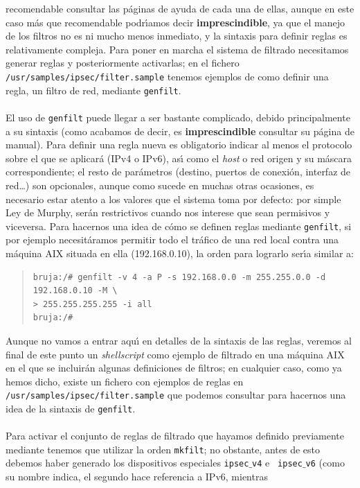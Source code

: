recomendable consultar las p\'aginas de ayuda de cada una de ellas, aunque en
este caso m\'as que recomendable podr\'{\i}amos decir {\bf imprescindible}, ya 
que el manejo de los filtros no es ni mucho menos inmediato, y la sintaxis para 
definir reglas es relativamente compleja. Para poner en marcha el sistema de 
filtrado necesitamos generar reglas y posteriormente activarlas; en el fichero 
{\tt /usr/samples/ipsec/filter.sample} tenemos ejemplos de como definir
una regla, un filtro de red, mediante {\tt genfilt}.\\
\\El uso de {\tt genfilt} puede llegar a ser bastante complicado, debido 
principalmente a su sintaxis (como acabamos de decir, es {\bf imprescindible}
consultar su p\'agina de manual). Para definir una regla nueva es obligatorio
indicar al menos el protocolo sobre el que se aplicar\'a (IPv4 o IPv6), as\'{\i}
como el {\it host} o red origen y su m\'ascara correspondiente; el resto de
par\'ametros (destino, puertos de conexi\'on, interfaz de red\ldots) son 
opcionales, aunque como sucede en muchas otras ocasiones, es necesario estar
atento a los valores que el sistema toma por defecto: por simple Ley de Murphy,
ser\'an restrictivos cuando nos interese que sean permisivos y viceversa. Para
hacernos una idea de c\'omo se definen reglas mediante {\tt genfilt}, si por 
ejemplo necesit\'aramos permitir todo el tr\'afico de una red local contra una
m\'aquina AIX situada en ella (192.168.0.10), la orden para lograrlo ser\'{\i}a
similar a:
\begin{quote}
\begin{verbatim}
bruja:/# genfilt -v 4 -a P -s 192.168.0.0 -m 255.255.0.0 -d 192.168.0.10 -M \
> 255.255.255.255 -i all
bruja:/# 
\end{verbatim}
\end{quote}
Aunque no vamos a entrar aqu\'{\i} en detalles de la sintaxis de las reglas, 
veremos al final de este punto un {\it shellscript} como ejemplo de filtrado en
una m\'aquina AIX en el que se incluir\'an algunas definiciones de filtros; en
cualquier caso, como ya hemos dicho, existe un fichero con ejemplos de reglas en
{\tt /usr/samples/ipsec/filter.sample} que podemos consultar para hacernos una
idea de la sintaxis de {\tt genfilt}.\\
\\Para activar el conjunto de reglas de filtrado que hayamos definido 
previamente mediante tenemos que utilizar la orden {\tt mkfilt}; no obstante, 
antes de esto
debemos haber generado los dispositivos especiales {\tt ipsec$\_$v4} e {\tt 
ipsec$\_$v6} (como su nombre indica, el segundo hace referencia a IPv6, mientras
